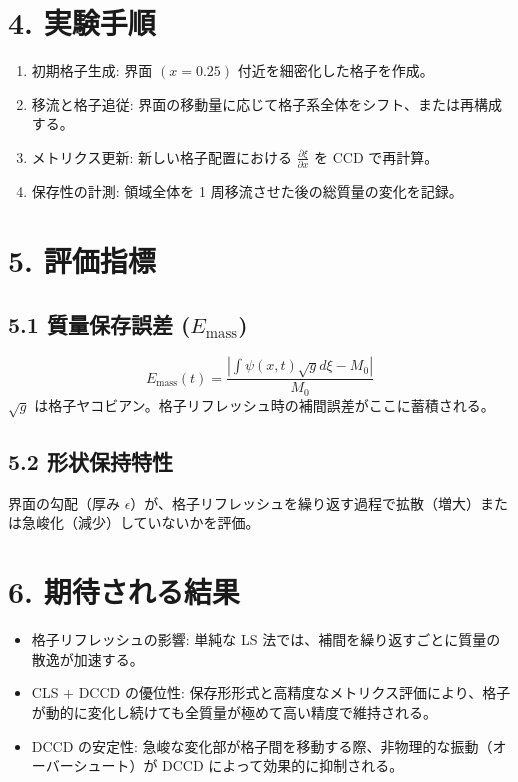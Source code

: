 \documentclass[12pt, a4paper, titlepage]{article}
\begin{document}
\section*{4. 実験手順}
\begin{enumerate}
    \item 初期格子生成: 界面 $(x=0.25)$ 付近を細密化した格子を作成。
    \item 移流と格子追従: 界面の移動量に応じて格子系全体をシフト、または再構成する。
    \item メトリクス更新: 新しい格子配置における $\frac{\partial \xi}{\partial x}$ を CCD で再計算。
    \item 保存性の計測: 領域全体を 1 周移流させた後の総質量の変化を記録。
\end{enumerate}

\section*{5. 評価指標}

\subsection*{5.1 質量保存誤差 ($E_{\text{mass}}$)}$$E_{\text{mass}}(t) = \frac{|\int \psi(x, t) \sqrt{g} d\xi - M_0|}{M_0}$$
$\sqrt{g}$ は格子ヤコビアン。格子リフレッシュ時の補間誤差がここに蓄積される。

\subsection*{5.2 形状保持特性}
界面の勾配（厚み $\epsilon$）が、格子リフレッシュを繰り返す過程で拡散（増大）または急峻化（減少）していないかを評価。

\section*{6. 期待される結果}
\begin{itemize}
    \item 格子リフレッシュの影響: 単純な LS 法では、補間を繰り返すごとに質量の散逸が加速する。
    \item CLS + DCCD の優位性: 保存形形式と高精度なメトリクス評価により、格子が動的に変化し続けても全質量が極めて高い精度で維持される。
    \item DCCD の安定性: 急峻な変化部が格子間を移動する際、非物理的な振動（オーバーシュート）が DCCD によって効果的に抑制される。
\end{itemize}
\end{document}
